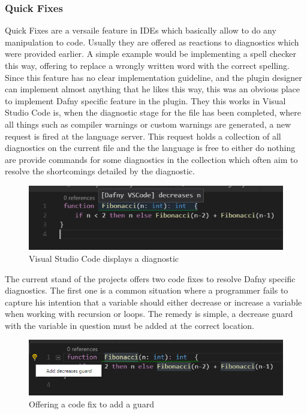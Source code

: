 \subsubsection{Quick Fixes} \label{quickfixes}
Quick Fixes are a versaile feature in IDEs which basically allow to do any manipulation to code. Usually they are offered as reactions to diagnostics which were provided earlier. A simple example would be implementing a spell checker this way, offering to replace a wrongly written word with the correct spelling. \newline
Since this feature has no clear implementation guideline, and the plugin designer can implement almost anything that he likes this way, this was an obvious place to implement Dafny specific feature in the plugin. \newline
They this works in Visual Studio Code is, when the diagnostic stage for the file has been completed, where all things such as compiler warnings or custom warnings are generated,  a new request is fired at the language server. This request holds a collection of all diagnostics on the current file and the the language is free to either do nothing are provide commands for some diagnostics in the collection which often aim to resolve the shortcomings detailed by the diagnostic. \newline
  \begin{figure}[H]
	\centering
	\includegraphics[width=1\textwidth]{img/diagnostic}
	\caption{Visual Studio Code displays a diagnostic}
	\label{fig:diagnostic}
\end{figure}
The current stand of the projects offers two code fixes to resolve Dafny specific diagnostics. \newline
The first one is a common situation where a programmer fails to capture his intention that a variable should either decrease or increase a variable when working with recursion or loops. The remedy is simple, a decrease guard with the variable in question must be added at the correct location. \newline
  \begin{figure}[H]
	\centering
	\includegraphics[width=1\textwidth]{img/decreaseGuard}
	\caption{Offering a code fix to add a guard}
	\label{fig:decreaseguard}
\end{figure}
